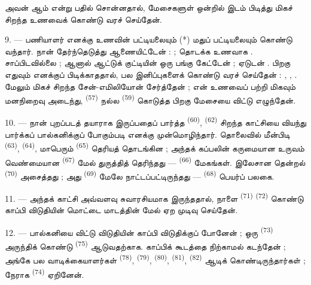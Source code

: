 
அவன் ஆம் என்று பதில் சொன்னதால், மேசைகளுள் ஒன்றில் இடம் பிடித்து
மிகச் சிறந்த உணவைக் கொண்டு வரச் செய்தேன்.

\VUsaut{4.0mm}
\VUsaut{3.0mm}

9. --- பணியாளர் எனக்கு உணவின் பட்டியலையும் (*) மதுப் பட்டியலையும்
கொண்டு வந்தார். நான் தேர்ந்தெடுத்து ஆணையிட்டேன் :    ; தொடக்க உணவாக
.  சாப்பிடவில்லை ;
ஆனால் ஆட்டுக் குட்டியின்  ஒரு பங்கு கேட்டேன் ;
 ஏடுடன் . பிறகு
 எதுவும் எனக்குப் பிடிக்காததால், பல
இனிப்புகளைக் கொண்டு வரச் செய்தேன் : ,
, . மேலும் மிகச் சிறந்த
சேன்-எமிலியோன்  சேர்த்தேன் ; என் உணவைப் பற்றி
மிகவும் மனநிறைவு அடைந்து,  \textsuperscript{(57)}
நல்ல  \textsuperscript{(59)} கொடுத்த பிறகு மேசையை
விட்டு எழுந்தேன்.

10. --- நான் புறப்படத் தயாராக இருப்பதைப் பார்த்த 
\textsuperscript{(60)},  \textsuperscript{(62)}
சிறந்த காட்சியை வியந்து பார்க்கப் பால்கனிக்குப் போகும்படி எனக்கு
முன்மொழிந்தார். தொலைவில் மீன்பிடி 
\textsuperscript{(63)}, 
\textsuperscript{(64)}, மாபெரும் 
\textsuperscript{(65)} தெரியத் தொடங்கின ; அந்தக் கப்பலின் கருமையான
உருவம் வெண்மையான  \textsuperscript{(67)} மேல்
துருத்தித் தெரிந்தது —  \textsuperscript{(66)}
மேகங்கள். இலேசான தென்றல்  \textsuperscript{(70)}
அசைத்தது ; அது  \textsuperscript{(69)} மேலே
நாட்டப்பட்டிருந்தது —  \textsuperscript{(68)}
பெயர்ப் பலகை.

\VUsaut{3.0mm}
\VUsaut{3.0mm}

11. --- அந்தக் காட்சி அவ்வளவு சுவாரசியமாக இருந்ததால், நாளை
 \textsuperscript{(71)}
 \textsuperscript{(72)} கொண்டு காப்பி விடுதியின்
மொட்டை மாடத்தின் மேல் ஏற முடிவு செய்தேன்.

12. --- பால்கனியை விட்டு விடுதியின் காப்பி விடுதிக்குப் போனேன் ; ஒரு
 \textsuperscript{(73)} அருந்திக் கொண்டு  \textsuperscript{(75)} ஆடுவதற்காக. காப்பிக் கூடத்தை நிற்காமல்
கடந்தேன் ; அங்கே பல வாடிக்கையாளர்கள் 
\textsuperscript{(78)},  \textsuperscript{(79)},
 \textsuperscript{(80)}, 
\textsuperscript{(81)},  \textsuperscript{(82)}
ஆடிக் கொண்டிருந்தார்கள் ; நேராக 
\textsuperscript{(74)} ஏறினேன்.


